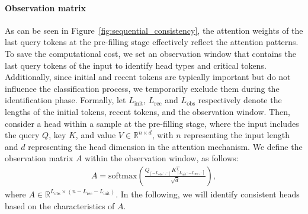 \paragraph{Observation matrix} 

As can be seen in Figure~\ref{fig:sequential_consistency}, the attention weights of the last query tokens at the pre-filling stage effectively reflect the attention patterns. To save the computational cost, we set an observation window that contains the last query tokens of the input to identify head types and critical tokens.
Additionally, since initial and recent tokens are typically important but do not influence the classification process, we temporarily exclude them during the identification phase. Formally, let \(L_{\text{init}}\), \(L_{\text{rec}}\) and \(L_{\text{obs}}\) respectively denote the lengths of the initial tokens, recent tokens, and the observation window. Then, consider a head within a sample at the pre-filling stage, where the input includes the query \( Q\), key \(K\), and value \(V \in \mathbb{R}^{n \times d} \), with \( n \) representing the input length and \( d \) representing the head dimension in the attention mechanism. We define the observation matrix $A$ within the observation window, as follows:
\begin{align}\label{eq:observation-matrix}
    A = \text{softmax}\left(\frac{Q_{[-L_{\text{obs}}:, :]} K_{[L_{\text{init}}:-L_{\text{rec}}, :]}^T}{\sqrt{d}}\right),
\end{align}
where $A\in \mathbb{R}^{L_{\text{obs}} \times \left(n-L_{\text{rec}}-L_{\text{init}}\right)}$.
In the following, we will identify consistent heads based on the characteristics of $A$.


